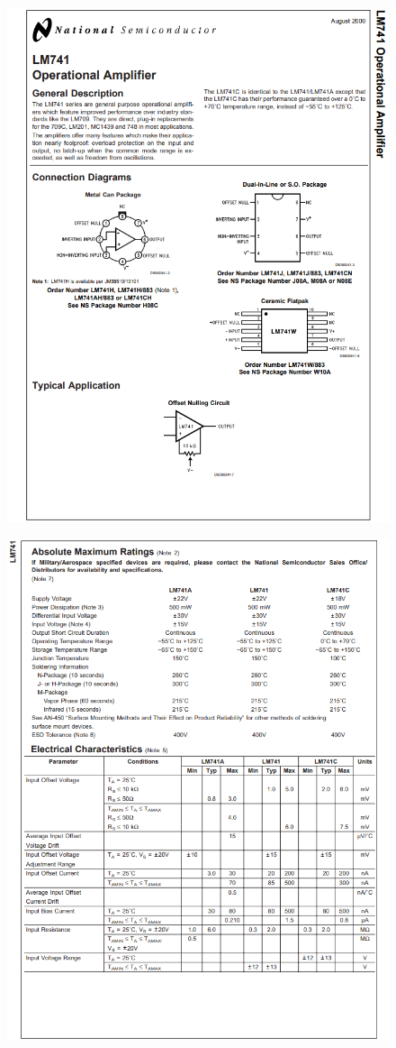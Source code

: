 \begin{figure}[h]
    \centering
    \includegraphics[width=0.9\linewidth]{Appendices/LM741_1.png}
    \label{LM741_1}
\end{figure}
\begin{figure}[h]
    \centering
    \includegraphics[width=0.9\linewidth]{Appendices/LM741_2.png}
    \label{LM741_2}
\end{figure}
